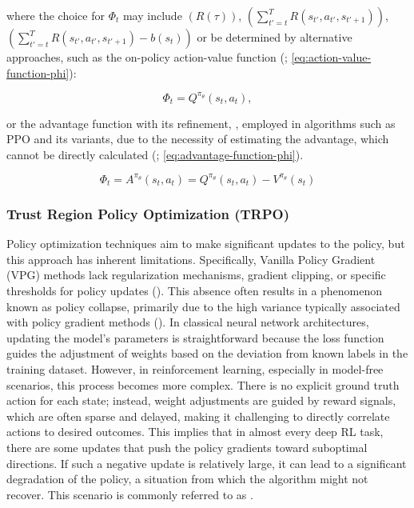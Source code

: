         \noindent where the choice for $\Phi_t$ may include  $\left(R(\tau)\right)$,  $\left(\sum_{t'= t}^{T} R(s_{t'}, a_{t'}, s_{t'+1})\right)$,  $\left(\sum_{t'= t}^{T} R(s_{t'}, a_{t'}, s_{t'+1}) - b(s_t)\right)$ or be determined by alternative approaches, such as the on-policy action-value function (\textcolor{deepblue}{\cite{SpinningUp2018}; \autoref{eq:action-value-function-phi}}):
        
        \begin{equation}
            \Phi_t = Q^{\pi_{\theta}} (s_t, a_t),
            \label{eq:action-value-function-phi}
        \end{equation}
        
        \noindent or the advantage function with its refinement, , employed in algorithms such as PPO and its variants, due to the necessity of estimating the advantage, which cannot be directly calculated (\textcolor{deepblue}{\cite{SpinningUp2018}; \autoref{eq:advantage-function-phi}}).
        
        \begin{equation}
            \Phi_t = A^{\pi_{\theta}} (s_t, a_t) = Q^{\pi_{\theta}} (s_t, a_t) - V^{\pi_{\theta}} (s_t)
            \label{eq:advantage-function-phi}
        \end{equation}

        \subsubsection{Trust Region Policy Optimization (TRPO)}
        \label{sec:trpo}

            \noindent Policy optimization techniques aim to make significant updates to the policy, but this approach has inherent limitations. Specifically, Vanilla Policy Gradient (VPG) methods lack regularization mechanisms, gradient clipping, or specific thresholds for policy updates (\textcolor{deepblue}{\cite{SpinningUp2018}}). This absence often results in a phenomenon known as policy collapse, primarily due to the high variance typically associated with policy gradient methods (\textcolor{deepblue}{\cite{dohare2023overcoming}}). In classical neural network architectures, updating the model’s parameters is straightforward because the loss function guides the adjustment of weights based on the deviation from known labels in the training dataset. However, in reinforcement learning, especially in model-free scenarios, this process becomes more complex. There is no explicit ground truth action for each state; instead, weight adjustments are guided by reward signals, which are often sparse and delayed, making it challenging to directly correlate actions to desired outcomes. This implies that in almost every deep RL task, there are some updates that push the policy gradients toward suboptimal directions. If such a negative update is relatively large, it can lead to a significant degradation of the policy, a situation from which the algorithm might not recover. This scenario is commonly referred to as .
            
